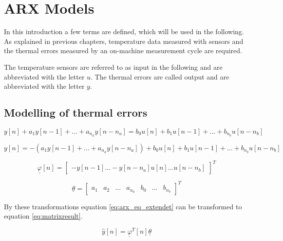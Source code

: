 \section{ARX Models}
\label{sec:ARX_models}


In this introduction a few terms are defined, which will be used in the following. As explained in previous chapters, temperature data measured with sensors and the thermal errors measured by an on-machine measurement cycle are required.

The temperature sensors are referred to as input in the following and are abbreviated with the letter $u$. The thermal errors are called output and are abbreviated with the letter $y$. 

\subsection{Modelling of thermal errors}
\label{sec:modelling of errors}


 \begin{equation}
	y[n]+a_1y[n-1]+...+a_{n_a}y[n-n_a] = b_0 u[n]+b_1u[n-1]+...+b_{n_b} u[n-n_b]
	\label{eq:arx_eq}
\end{equation}



 \begin{equation}
	y[n] = -(a_1y[n-1]+...+a_{n_a}y[n-n_a]) + b_0 u[n]+b_1u[n-1]+...+b_{n_b} u[n-n_b]
	\label{eq:arx_eq_extendet}
\end{equation}


 \begin{equation}
 	\underline{\varphi}[n] = \begin{bmatrix}
		-y[n-1]...-y[n-n_a]  u[n]...u[n-n_b]
				\end{bmatrix}^T
	\label{eq:arx_eq_matix}
\end{equation}

 \begin{equation}
	\underline{\theta} =  \begin{bmatrix}
		a_1 & a_2 & ... & a_{n_a} & b_0 & ... & b_{n_b}
				\end{bmatrix}^T
	\label{eq:thetavec}
\end{equation}

By these transformations equation \ref{eq:arx_eq_extendet} can be transformed to equation \ref{eq:matrixresult}.


 \begin{equation}
			\hat{y}[n] = \underline{\varphi}^T[n] \underline{\theta}		
	\label{eq:matrixresult}
\end{equation}



